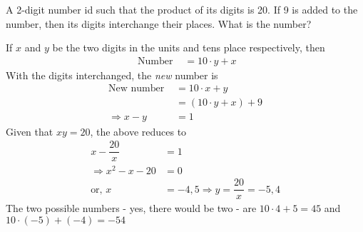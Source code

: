 
%
%
%
%
% 
% 

\question A 2-digit number id such that the product of its digits is 20. If 9 
is added to the number, then its digits interchange their places. What is the 
number? 

\insertQR{}

\ifprintanswers
\fi 

\begin{solution}
	If $x$ and $y$ be the two digits in the units and tens place respectively, then
	\begin{align}
		\text{ Number } &= 10\cdot y + x 
	\end{align}
	With the digits interchanged, the \textit{new} number is 
	\begin{align}
		\text{New number } &= 10\cdot x + y \\
		                   &= (10\cdot y + x) + 9 \\
		   \Rightarrow x - y &= 1
	\end{align}
	Given that $xy = 20$, the above reduces to 
	\begin{align}
		x - \dfrac{20}{x} &= 1 \\
		\Rightarrow x^2 - x - 20 &= 0 \\
		\text{or, } x &= -4, 5 \Rightarrow y = \dfrac{20}{x} = -5, 4
	\end{align}
	The two possible numbers - yes, there would be two - are $10\cdot4 + 5 = 45$ 
	and $10\cdot (-5) + (-4) = -54$
\end{solution}
